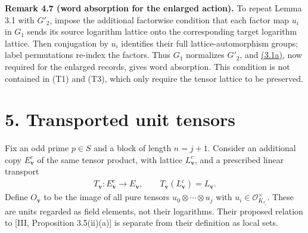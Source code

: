 \documentclass[11pt,a4paper]{amsart}
\begin{document}
\par\smallskip\noindent\textbf{Remark 4.7 (word absorption for the enlarged action).} To repeat Lemma 3.1 with $G'_2$, impose the additional factorwise condition that each factor map $u_i$ in $G_1$ sends its source logarithm lattice onto the corresponding target logarithm lattice. Then conjugation by $u_i$ identifies their full lattice-automorphism groups; label permutations re-index the factors. Thus $G_1$ normalizes $G'_2$, and \hyperref[eq:3.1a]{(3.1a)}, now required for the enlarged records, gives word absorption. This condition is not contained in (T1) and (T3), which only require the tensor lattice to be preserved.


\section*{5. Transported unit tensors}

Fix an odd prime $p\in S$ and a block of length $n=j+1$. Consider an additional copy $E^c_{\mathbf v}$ of the same tensor product, with lattice $L^c_{\mathbf v}$, and a prescribed linear transport
\begin{equation}
\begin{gathered}
T_{\mathbf v}:E^c_{\mathbf v}\longrightarrow E_{\mathbf v},\qquad
T_{\mathbf v}(L^c_{\mathbf v})=L_{\mathbf v}.
\end{gathered}
\tag{5.1}\label{eq:5.1}
\end{equation}
Define $O_{\mathbf v}$ to be the image of all pure tensors $u_0\otimes\cdots\otimes u_j$ with $u_i\in\mathcal O_{K_{v_i}}^\times$. These are units regarded as field elements, not their logarithms. Their proposed relation to [III, Proposition 3.5(ii)(a)] is separate from their definition as local sets.
\end{document}
